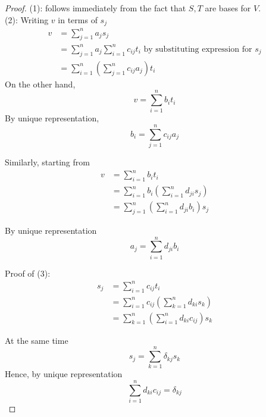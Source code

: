 \begin{proof}
    (1): follows immediately from the fact that $S, T$ are bases for $V$. \\

    (2): Writing $v$ in terms of $s_j$
    \begin{align*}
        v &= \sum\limits_{j = 1}^{n} a_j s_j \\
        &= \sum\limits_{j = 1}^{n} a_j \sum\limits_{i = 1}^{n} c_{ij} t_i \text{ by substituting expression for $s_j$} \\
        &= \sum\limits_{i = 1}^{n} \left( \sum\limits_{j = 1}^{n}  c_{ij} a_j\right) t_i
    \end{align*}
    On the other hand, 
    \[
        v = \sum\limits_{i = 1}^{n} b_i t_i
    \]
    By unique representation, 
    \[
        b_i = \sum\limits_{j = 1}^{n}  c_{ij}a_j
    \] 

    Similarly, starting from 
    \begin{align*}
        v &= \sum\limits_{ i = 1}^{n} b_i t_i \\
        &= \sum\limits_{i = 1}^{n} b_i \left( \sum\limits_{i = 1}^{n} d_{ji}s_j \right)  \\
        &= \sum\limits_{j = 1}^{n} \left( \sum\limits_{i = 1}^{n} d_{ji}b_i \right) s_j
    \end{align*}

    By unique representation 
    \[
        a_j = \sum\limits_{i = 1}^{n} d_{ji}b_i
    \]

    Proof of (3): 
    \begin{align*}
        s_j &= \sum\limits_{i = 1}^{n} c_{ij}t_i \\
        &= \sum\limits_{i = 1}^{n}  c_{ij} \left( \sum\limits_{k = 1}^{n} d_{ki} s_k\right)  \\
        &= \sum\limits_{k = 1}^{n}  \left( \sum\limits_{i = 1}^{n} d_{ki} c_{ij}\right)  s_k
    \end{align*}

    At the same time 
    \[
        s_j = \sum\limits_{k = 1}^{n} \delta_{kj} s_k
    \]
    Hence, by unique representation 
    \[
        \sum\limits_{i = 1}^{n} d_{ki} c_{ij} = \delta_{kj}
    \]
    
    
    
\end{proof}























\newpage